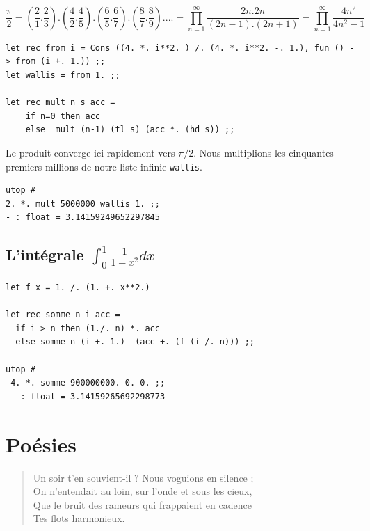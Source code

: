\documentclass[11pt]{book}
\begin{document}
\[ \frac{\pi}{2} = ( \frac{2}{1}.\frac{2}{3} ) . (\frac{4}{2}.\frac{4}{5} ).(\frac{6}{5}.\frac{6}{7} ).(\frac{8}{7}.\frac{8}{9} ) . ...  =  \prod_{n=1}^\infty \frac{2n.2n}{(2n-1).(2n+1)} = \prod_{n=1}^\infty \frac{4n^2}{4n^2-1}\]
\vspace{0.3cm}	
\begin{Verbatim}
let rec from i = Cons ((4. *. i**2. ) /. (4. *. i**2. -. 1.), fun () -> from (i +. 1.)) ;;
let wallis = from 1. ;;

let rec mult n s acc =
	if n=0 then acc
	else  mult (n-1) (tl s) (acc *. (hd s)) ;;
\end{Verbatim}
Le produit converge ici rapidement vers $\pi /2$. Nous multiplions les cinquantes premiers millions 
de notre liste infinie \verb+wallis+.
\begin{Verbatim}
utop # 
2. *. mult 5000000 wallis 1. ;;
- : float = 3.14159249652297845
\end{Verbatim}

\subsection{L'intégrale $\int_0^1 \frac{1}{1+x^2} dx$}
 
\begin{Verbatim}
let f x = 1. /. (1. +. x**2.)

let rec somme n i acc =
  if i > n then (1./. n) *. acc 
  else somme n (i +. 1.)  (acc +. (f (i /. n))) ;;

utop # 
 4. *. somme 900000000. 0. 0. ;;
 - : float = 3.14159265692298773
\end{Verbatim}




\section{Poésies}
\begin{verse}
	Un soir t'en souvient-il ? Nous voguions en silence ; \\
	On n’entendait au loin, sur l’onde et sous les cieux,  \\
	Que le bruit des rameurs qui frappaient en cadence     \\
	Tes flots harmonieux. \\
\end{verse}
\end{document}
